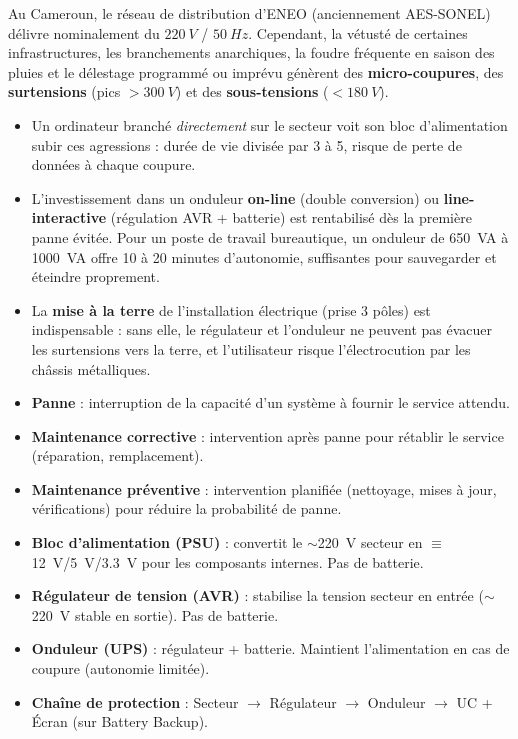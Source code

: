 \documentclass[11pt]{article}
\begin{document}
\begin{savaistu}
Au Cameroun, le réseau de distribution d'ENEO (anciennement AES-SONEL) délivre nominalement du $\SI{220}{V}$ / $\SI{50}{Hz}$. Cependant, la vétusté de certaines infrastructures, les branchements anarchiques, la foudre fréquente en saison des pluies et le délestage programmé ou imprévu génèrent des \textbf{micro-coupures}, des \textbf{surtensions} (pics $> \SI{300}{V}$) et des \textbf{sous-tensions} ($< \SI{180}{V}$).
\begin{itemize}
\item Un ordinateur branché \emph{directement} sur le secteur voit son bloc d'alimentation subir ces agressions : durée de vie divisée par 3 à 5, risque de perte de données à chaque coupure.
\item L'investissement dans un onduleur \textbf{on-line} (double conversion) ou \textbf{line-interactive} (régulation AVR + batterie) est rentabilisé dès la première panne évitée. Pour un poste de travail bureautique, un onduleur de \SI{650}{VA} à \SI{1000}{VA} offre 10 à 20 minutes d'autonomie, suffisantes pour sauvegarder et éteindre proprement.
\item La \textbf{mise à la terre} de l'installation électrique (prise 3 pôles) est indispensable : sans elle, le régulateur et l'onduleur ne peuvent pas évacuer les surtensions vers la terre, et l'utilisateur risque l'électrocution par les châssis métalliques.
\end{itemize}
\end{savaistu}

\begin{definition}
\begin{itemize}
\item \textbf{Panne} : interruption de la capacité d'un système à fournir le service attendu.
\item \textbf{Maintenance corrective} : intervention après panne pour rétablir le service (réparation, remplacement).
\item \textbf{Maintenance préventive} : intervention planifiée (nettoyage, mises à jour, vérifications) pour réduire la probabilité de panne.
\item \textbf{Bloc d'alimentation (PSU)} : convertit le $\sim$\SI{220}{V} secteur en $\equiv$ \SI{12}{V}/\SI{5}{V}/\SI{3,3}{V} pour les composants internes. Pas de batterie.
\item \textbf{Régulateur de tension (AVR)} : stabilise la tension secteur en entrée ($\sim$\SI{220}{V} stable en sortie). Pas de batterie.
\item \textbf{Onduleur (UPS)} : régulateur + batterie. Maintient l'alimentation en cas de coupure (autonomie limitée).
\item \textbf{Chaîne de protection} : Secteur $\rightarrow$ Régulateur $\rightarrow$ Onduleur $\rightarrow$ UC + Écran (sur Battery Backup).
\end{itemize}
\end{definition}
\end{document}
